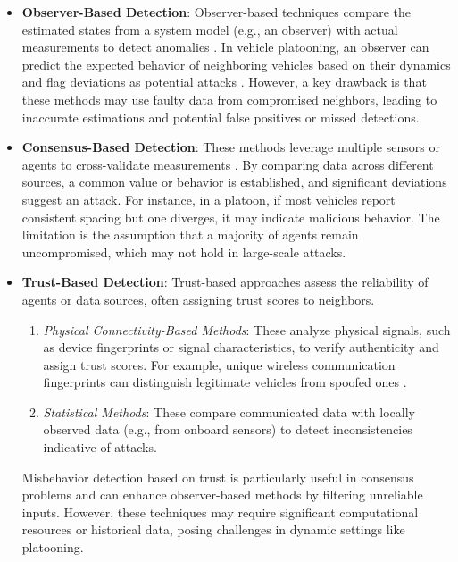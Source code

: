 \documentclass[letterpaper, 10pt, conference]{ieeeconf}  %
\begin{document}
\begin{itemize}
    \item \textbf{Observer-Based Detection}: 
    Observer-based techniques compare the estimated states from a system model (e.g., an observer) with actual measurements to detect anomalies \cite{2_obs_Angelo , SHAMES20112757}. In vehicle platooning, an observer can predict the expected behavior of neighboring vehicles based on their dynamics and flag deviations as potential attacks \cite{KF_chisquare_meusure}. However, a key drawback is that these methods may use faulty data from compromised neighbors, leading to inaccurate estimations and potential false positives or missed detections.

    \item \textbf{Consensus-Based Detection}: 
    These methods leverage multiple sensors or agents to cross-validate measurements \cite{Guitao_multi_mesure}. By comparing data across different sources, a common value or behavior is established, and significant deviations suggest an attack. For instance, in a platoon, if most vehicles report consistent spacing but one diverges, it may indicate malicious behavior. The limitation is the assumption that a majority of agents remain uncompromised, which may not hold in large-scale attacks.

    \item \textbf{Trust-Based Detection}: 
    Trust-based approaches assess the reliability of agents or data sources, often assigning trust scores to neighbors.
    \begin{enumerate}
        \item \textit{Physical Connectivity-Based Methods}: These analyze physical signals, such as device fingerprints or signal characteristics, to verify authenticity and assign trust scores. For example, unique wireless communication fingerprints can distinguish legitimate vehicles from spoofed ones \cite{trust_physic_connecte}.
        \item \textit{Statistical Methods}: These compare communicated data with locally observed data (e.g., from onboard sensors) to detect inconsistencies indicative of attacks. 
    \end{enumerate}
    Misbehavior detection based on trust is particularly useful in consensus problems and can enhance observer-based methods by filtering unreliable inputs. However, these techniques may require significant computational resources or historical data, posing challenges in dynamic settings like platooning.
\end{itemize}
\end{document}
